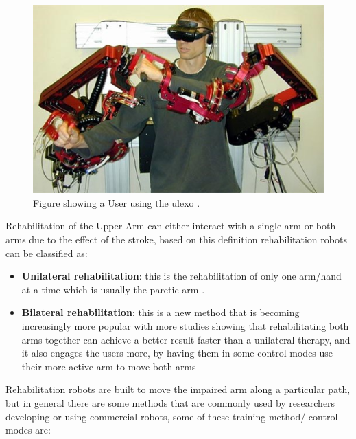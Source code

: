 \begin{figure}[p]%
	\centering
	\includegraphics[width=\linewidth]{figures/ch2/ulexo}
	\caption{Figure showing a User using the \ac{ulexo} \cite{Shen2019}.}
	\label{fig:ulexo}
\end{figure}
Rehabilitation of the Upper Arm can either interact with a single arm or both arms due to the effect of the stroke, based on this definition rehabilitation robots can be classified as:
\begin{itemize}%
	\item \textbf{Unilateral rehabilitation}: this is the rehabilitation of only one arm/hand at a time which is usually the paretic arm \cite{Abdullah2011,Masiero2007a}.
	\item \textbf{Bilateral rehabilitation}: this is a new method that is becoming increasingly more popular with more studies showing that rehabilitating both arms together can achieve a better result faster than a unilateral therapy, and it also engages the users more,  by having them in some control modes use their more active arm to move both arms \cite{Lum1999,VanDelden2015,Wu2013,Tijs2006,Simkins2016,Shen2019a,Hsieh2016,Zhang2018,Stoykov2010}
\end{itemize}
Rehabilitation robots are built to move the impaired arm along a particular path, but in general there are some methods that are commonly used by researchers developing or using commercial robots, some of these training method/ control modes are:
